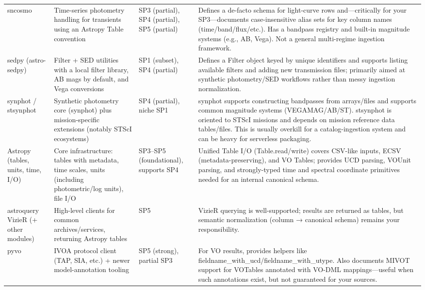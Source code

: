 \documentclass[twocolumn]{aastex701}
\begin{document}
\begin{longtable}{p{3cm} p{3cm} p{3cm} p{5cm}}
sncosmo &
Time-series photometry handling for transients using an Astropy Table convention &
SP3 (partial), SP4 (partial), SP5 (partial) &
Defines a de-facto schema for light-curve rows and—critically for your SP3—documents case-insensitive alias sets for key column names (time/band/flux/etc.). Has a bandpass registry and built-in magnitude systems (e.g., AB, Vega). Not a general multi-regime ingestion framework. \citep{ref7} \\

sedpy (astro-sedpy) &
Filter + SED utilities with a local filter library, AB mags by default, and Vega conversions &
SP1 (subset), SP4 (partial) &
Defines a Filter object keyed by unique identifiers and supports listing available filters and adding new transmission files; primarily aimed at synthetic photometry/SED workflows rather than messy ingestion normalization. \citep{ref8} \\

synphot / stsynphot &
Synthetic photometry core (synphot) plus mission-specific extensions (notably STScI ecosystems) &
SP4 (partial), niche SP1 &
synphot supports constructing bandpasses from arrays/files and supports common magnitude systems (VEGAMAG/AB/ST). stsynphot is oriented to STScI missions and depends on mission reference data tables/files. This is usually overkill for a catalog-ingestion system and can be heavy for serverless packaging. \citep{ref9} \\

Astropy (tables, units, time, I/O) &
Core infrastructure: tables with metadata, time scales, units (including photometric/log units), file I/O &
SP3–SP5 (foundational), supports SP4 &
Unified Table I/O (Table.read/write) covers CSV-like inputs, ECSV (metadata-preserving), and VO Tables; provides UCD parsing, VOUnit parsing, and strongly-typed time and spectral coordinate primitives needed for an internal canonical schema. \citep{ref10} \\

astroquery VizieR (+ other modules) &
High-level clients for common archives/services, returning Astropy tables &
SP5 &
VizieR querying is well-supported; results are returned as tables, but semantic normalization (column → canonical schema) remains your responsibility. \citep{ref11} \\

pyvo &
IVOA protocol client (TAP, SIA, etc.) + newer model-annotation tooling &
SP5 (strong), partial SP3 &
For VO results, provides helpers like fieldname\_with\_ucd/fieldname\_with\_utype. Also documents MIVOT support for VOTables annotated with VO-DML mappings—useful when such annotations exist, but not guaranteed for your sources. \citep{ref12} \\


\end{longtable}
\end{document}
